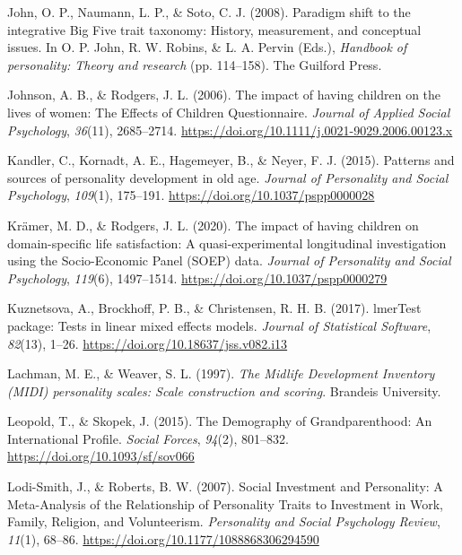 \documentclass[
  english,
  man, noextraspace]{apa7}
\begin{document}
\leavevmode\hypertarget{ref-johnParadigmShiftIntegrative2008}{}%
John, O. P., Naumann, L. P., \& Soto, C. J. (2008). Paradigm shift to the integrative Big Five trait taxonomy: History, measurement, and conceptual issues. In O. P. John, R. W. Robins, \& L. A. Pervin (Eds.), \emph{Handbook of personality: Theory and research} (pp. 114--158). The Guilford Press.

\leavevmode\hypertarget{ref-johnsonImpactHavingChildren2006}{}%
Johnson, A. B., \& Rodgers, J. L. (2006). The impact of having children on the lives of women: The Effects of Children Questionnaire. \emph{Journal of Applied Social Psychology}, \emph{36}(11), 2685--2714. \url{https://doi.org/10.1111/j.0021-9029.2006.00123.x}

\leavevmode\hypertarget{ref-kandlerPatternsSourcesPersonality2015a}{}%
Kandler, C., Kornadt, A. E., Hagemeyer, B., \& Neyer, F. J. (2015). Patterns and sources of personality development in old age. \emph{Journal of Personality and Social Psychology}, \emph{109}(1), 175--191. \url{https://doi.org/10.1037/pspp0000028}

\leavevmode\hypertarget{ref-kramerImpactHavingChildren2020}{}%
Krämer, M. D., \& Rodgers, J. L. (2020). The impact of having children on domain-specific life satisfaction: A quasi-experimental longitudinal investigation using the Socio-Economic Panel (SOEP) data. \emph{Journal of Personality and Social Psychology}, \emph{119}(6), 1497--1514. \url{https://doi.org/10.1037/pspp0000279}

\leavevmode\hypertarget{ref-R-lmerTest}{}%
Kuznetsova, A., Brockhoff, P. B., \& Christensen, R. H. B. (2017). lmerTest package: Tests in linear mixed effects models. \emph{Journal of Statistical Software}, \emph{82}(13), 1--26. \url{https://doi.org/10.18637/jss.v082.i13}

\leavevmode\hypertarget{ref-lachmanMidlifeDevelopmentInventory1997}{}%
Lachman, M. E., \& Weaver, S. L. (1997). \emph{The Midlife Development Inventory (MIDI) personality scales: Scale construction and scoring}. Brandeis University.

\leavevmode\hypertarget{ref-leopoldDemographyGrandparenthoodInternational2015}{}%
Leopold, T., \& Skopek, J. (2015). The Demography of Grandparenthood: An International Profile. \emph{Social Forces}, \emph{94}(2), 801--832. \url{https://doi.org/10.1093/sf/sov066}

\leavevmode\hypertarget{ref-lodi-smithSocialInvestmentPersonality2007}{}%
Lodi-Smith, J., \& Roberts, B. W. (2007). Social Investment and Personality: A Meta-Analysis of the Relationship of Personality Traits to Investment in Work, Family, Religion, and Volunteerism. \emph{Personality and Social Psychology Review}, \emph{11}(1), 68--86. \url{https://doi.org/10.1177/1088868306294590}
\end{document}
